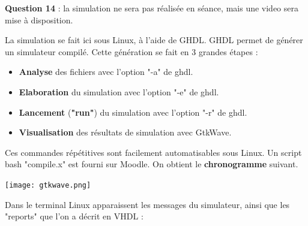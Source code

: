 \documentclass[a4paper,11pt]{exam}
\begin{document}
\begin{questions}
  \question \textbf{Question 14} : la simulation ne sera pas réalisée en séance, mais une video sera mise à disposition.
  \begin{solution}
    La simulation se fait ici sous Linux, à l'aide de GHDL. GHDL permet de générer un simulateur compilé. Cette génération se fait en 3 grandes étapes :
    \begin{itemize}
      \item \textbf{Analyse }des fichiers avec l'option "-a" de ghdl.
      \item \textbf{Elaboration} du simulation avec l'option "-e" de ghdl.
      \item \textbf{Lancement} (\textbf{"run"}) du simulation avec l'option "-r" de ghdl.
      \item \textbf{Visualisation} des résultats de simulation avec GtkWave.
    \end{itemize}
    Ces commandes répétitives sont facilement automatisables sous Linux. Un script bash "compile.x" est fourni sur Moodle.
    On obtient le \textbf{chronogramme} suivant.


    \begin{center}
       \texttt{[image: gtkwave.png]}
    \end{center}
    Dans le terminal Linux apparaissent les messages du simulateur, ainsi que les "reports" que l'on a décrit en VHDL :


\end{solution}
\end{questions}
\end{document}
